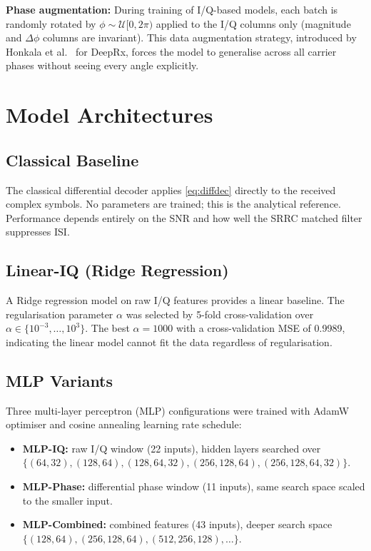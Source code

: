 \documentclass[journal]{IEEEtran}
\begin{document}
\textbf{Phase augmentation:} During training of I/Q-based models, each batch is
randomly rotated by $\phi \sim \mathcal{U}[0, 2\pi)$ applied to the I/Q columns
only (magnitude and $\Delta\phi$ columns are invariant). This data augmentation
strategy, introduced by Honkala et al.\ \cite{honkala2021deeprx} for DeepRx, forces the
model to generalise across all carrier phases without seeing every angle explicitly.

\section{Model Architectures}
\label{sec:models}

\subsection{Classical Baseline}

The classical differential decoder applies \eqref{eq:diffdec} directly to the
received complex symbols. No parameters are trained; this is the analytical
reference. Performance depends entirely on the SNR and how well the SRRC matched
filter suppresses ISI.

\subsection{Linear-IQ (Ridge Regression)}

A Ridge regression model \cite{pedregosa2011scikit} on raw I/Q features provides a
linear baseline. The regularisation parameter $\alpha$ was selected by 5-fold
cross-validation over $\alpha \in \{10^{-3}, \ldots, 10^3\}$. The best
$\alpha = 1000$ with a cross-validation MSE of 0.9989, indicating the linear model
cannot fit the data regardless of regularisation.

\subsection{MLP Variants}

Three multi-layer perceptron (MLP) configurations were trained with AdamW optimiser
\cite{loshchilov2019decoupled} and cosine annealing learning rate schedule:

\begin{itemize}
  \item \textbf{MLP-IQ:} raw I/Q window (22 inputs), hidden layers searched over
        $\{(64,32), (128,64), (128,64,32), (256,128,64), (256,128,64,32)\}$.
  \item \textbf{MLP-Phase:} differential phase window (11 inputs), same search
        space scaled to the smaller input.
  \item \textbf{MLP-Combined:} combined features (43 inputs), deeper search space
        $\{(128,64), (256,128,64), (512,256,128), \ldots\}$.
\end{itemize}
\end{document}
